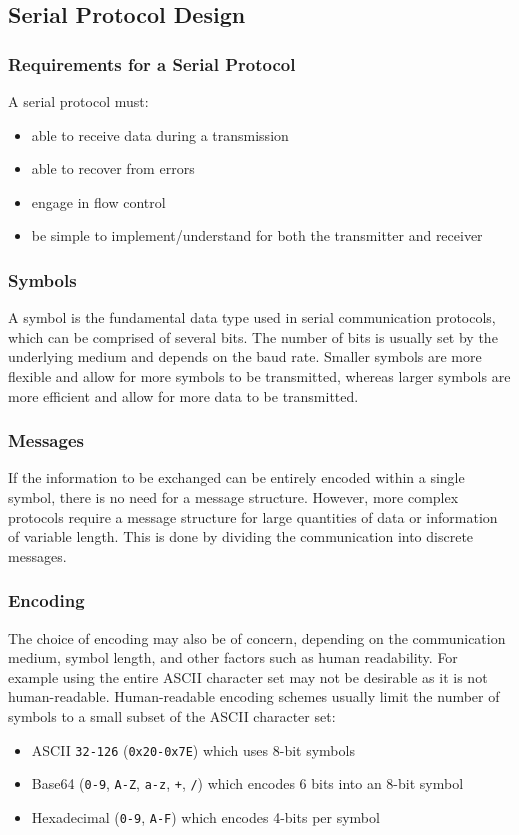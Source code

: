 \documentclass{article}
\begin{document}
\subsection{Serial Protocol Design}
\subsubsection{Requirements for a Serial Protocol}
A serial protocol must:
\begin{itemize}
    \item able to receive data during a transmission
    \item able to recover from errors
    \item engage in flow control
    \item be simple to implement/understand for both the transmitter
          and receiver
\end{itemize}
\subsubsection{Symbols}
A symbol is the fundamental data type used in serial communication
protocols, which can be comprised of several bits. The number of bits
is usually set by the underlying medium and depends on the baud rate.
Smaller symbols are more flexible and allow for more symbols to be
transmitted, whereas larger symbols are more efficient and allow for
more data to be transmitted.
\subsubsection{Messages}
If the information to be exchanged can be entirely encoded within a
single symbol, there is no need for a message structure. However, more
complex protocols require a message structure for large quantities of
data or information of variable length. This is done by dividing the
communication into discrete messages.
\subsubsection{Encoding}
The choice of encoding may also be of concern, depending on the
communication medium, symbol length, and other factors such as human
readability. For example using the entire ASCII character set may not
be desirable as it is not human-readable. Human-readable encoding
schemes usually limit the number of symbols to a small subset of the
ASCII character set:
\begin{itemize}
    \item ASCII \texttt{32-126} (\texttt{0x20-0x7E})
          which uses 8-bit symbols
    \item Base64 (\texttt{0-9}, \texttt{A-Z},
          \texttt{a-z}, \texttt{+}, \texttt{/})
          which encodes 6 bits into an 8-bit symbol
    \item Hexadecimal (\texttt{0-9}, \texttt{A-F}) which
          encodes 4-bits per symbol
\end{itemize}
\end{document}
